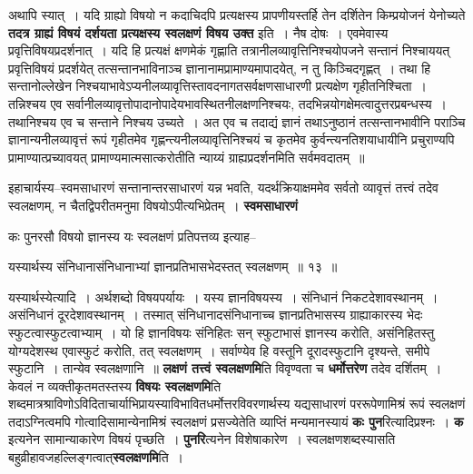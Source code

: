 \documentclass[article,12pt,a4paper]{memoir}
\begin{document}
	  \pstart अथापि स्यात् । यदि ग्राह्यो विषयो न कदाचिदपि प्रत्यक्षस्य प्रापणीयस्तर्हि तेन दर्शितेन किम्प्रयोजनं येनोच्यते \textbf{तदत्र ग्राह्यं विषयं दर्शयता प्रत्यक्षस्य स्वलक्षणं विषय उक्त} इति । नैष दोषः । एवमेवास्य प्रवृत्तिविषयप्रदर्शनात् । यदि हि प्रत्यक्षं क्षणमेकं गृह्णाति तत्रानीलव्यावृत्तिनिश्चयोपजने सन्तानं निश्चाययत् प्रवृत्तिविषयं प्रदर्शयेत् तत्सन्तानभाविनाञ्च ज्ञानानामप्रामाण्यमापादयेत्, न तु किञ्चिदगृह्णत् । तथा हि सन्तानोल्लेखेन निश्चयाभावेऽप्यनीलव्यावृत्तिस्तावदनागतसर्वक्षणसाधारणी प्रत्यक्षेण गृहीतनिश्चिता । तन्निश्चय एव सर्वानीलव्यावृत्तोपादानोपादेयभावस्थितनीलक्षणनिश्चयः, तदभिन्नयोगक्षेमत्वादुत्तरप्रबन्धस्य । तथानिश्चय एव च सन्ताने निश्चय उच्यते । अत एव च तदाद्यं ज्ञानं तथाऽनुष्ठानं तत्सन्तानभावीनि पराञ्चि ज्ञानान्यनीलव्यावृत्तं रूपं गृहीतमेव गृह्णन्त्यनीलव्यावृत्तिनिश्चयं च कृतमेव कुर्वन्त्यनतिशयाधायीनि प्रचुराण्यपि प्रामाण्यात्प्रच्यावयत् प्रामाण्यमात्मसात्करोतीति न्याय्यं ग्राह्यप्रदर्शनमिति सर्वमवदातम् ॥
	\pend
      

	  \pstart इहाचार्यस्य--स्वमसाधारणं सन्तानान्तरसाधारणं यन्न भवति, यदर्थक्रियाक्षममेव सर्वतो व्यावृत्तं तत्त्वं तदेव स्वलक्षणम्, न चैतद्विपरीतमनुमा विषयोऽपीत्यभिप्रेतम् । \textbf{स्वमसाधारणं} \leavevmode{} 
	  
	कः पुनरसौ विषयो ज्ञानस्य यः स्वलक्षणं प्रतिपत्तव्य इत्याह--  
	  
	यस्यार्थस्य संनिधानासंनिधानाभ्यां ज्ञानप्रतिभासभेदस्तत् स्वलक्षणम् ॥ १३ ॥ 
	  
	यस्यार्थस्येत्यादि । अर्थशब्दो विषयपर्यायः । यस्य ज्ञानविषयस्य । संनिधानं निकटदेशावस्थानम् । असंनिधानं दूरदेशावस्थानम् । तस्मात् संनिधानादसंनिधानाच्च ज्ञानप्रतिभासस्य ग्राह्याकारस्य भेदः स्फुटत्वास्फुटत्वाभ्याम् । यो हि ज्ञानविषयः संनिहितः सन् स्फुटाभासं ज्ञानस्य करोति, असंनिहितस्तु योग्यदेशस्थ एवास्फुटं करोति, तत् स्वलक्षणम् । सर्वाण्येव हि वस्तूनि दूरादस्फुटानि दृश्यन्ते, समीपे स्फुटानि । तान्येव स्वलक्षणानि ॥ \textbf{लक्षणं तत्त्वं स्वलक्षणमि}ति विवृण्वता च \textbf{धर्मोत्तरेण} तदेव दर्शितम् । केवलं न व्यक्तीकृतमतस्तस्य \textbf{विषयः स्वलक्षणमि}ति शब्दमात्रश्राविणोऽविदिताचार्याभिप्रायस्याविभावितधर्मोत्तरविवरणार्थस्य यद्यसाधारणं पररूपेणामिश्रं रूपं स्वलक्षणं तदाऽग्नित्वमपि गोत्वादिसामान्येनामिश्रं स्वलक्षणं प्रसज्येतेति व्याप्तिं मन्यमानस्यायं \textbf{कः पुन}रित्यादिप्रश्नः । \textbf{क} इत्यनेन सामान्याकारेण विषयं पृच्छति । \textbf{पुनरि}त्यनेन विशेषाकारेण । स्वलक्षणशब्दस्यासति बहुव्रीहावजहल्लिङ्गत्वात्\textbf{स्वलक्षणमि}ति ।
	\pend
      
\end{document}
